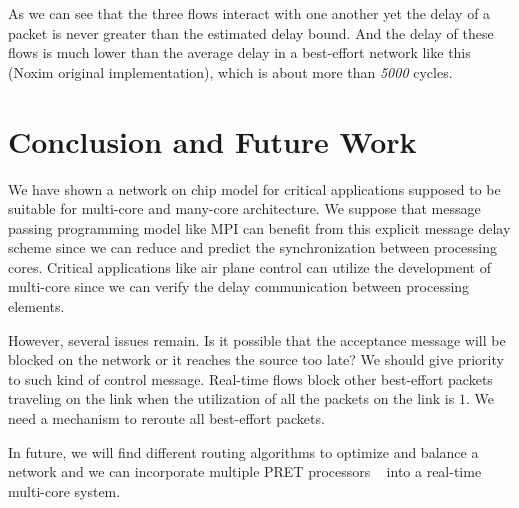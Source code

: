 \documentclass[conference, twocolumn]{IEEEtran}
\theoremstyle{definition}
\begin{document}
As we can see that the three flows interact with one another yet the delay of a
packet is never greater than the estimated delay bound. And the delay of these
flows is much lower than the average delay in a best-effort network like
this (Noxim original implementation), which is about more than {\em 5000}
cycles.

\section{Conclusion and Future Work}
We have shown a network on chip model for critical applications supposed to be
suitable for multi-core and many-core architecture. We suppose that message
passing programming model like MPI can benefit from this explicit message
delay scheme since we can reduce and predict the synchronization between
processing cores. Critical applications like air plane control can utilize the
development of multi-core since we can verify the delay communication between
processing elements.

However, several issues remain. Is it possible that the acceptance
message will be blocked on the network or it reaches the source too late? We
should give priority to such kind of control message. Real-time flows block
other best-effort packets traveling on the link when the utilization of all the
packets on the link is $1$. We need a mechanism to reroute all best-effort packets.

In future, we will find different routing algorithms to optimize and balance a
network and we can incorporate multiple PRET processors ~\cite{LicklyPRET} into
a real-time multi-core system.



\end{document}
